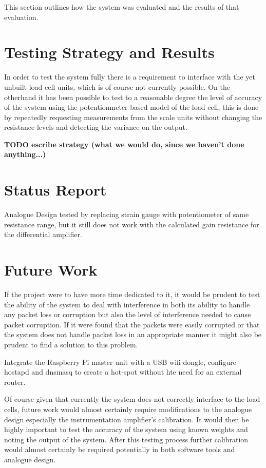 This section outlines how the system was evaluated and the results of that evaluation.

\section{Testing Strategy and Results}

In order to test the system fully there is a requirement to interface with the yet unbuilt load cell units, which is of course not currently possible. On the otherhand it has been possible to test to a reasonable degree the level of accuracy of the system using the potentionmeter based model of the load cell, this is done by repeatedly requesting measurements from the scale units without changing the resistance levels and detecting the variance on the output. 

\textbf{TODO escribe strategy (what we would do, since we haven't done anything...)}

\section{Status Report}

Analogue Design tested by replacing strain gauge with potentiometer of same resistance range, but it still does not work with the calculated gain resistance for the differential amplifier.

\section{Future Work}

If the project were to have more time dedicated to it, it would be prudent to test the ability of the system to deal with interference in both its ability to handle any packet loss or corruption but also the level of interference needed to cause packet corruption. If it were found that the packets were easily corrupted or that the system does not handle packet loss in an appropriate manner it might also be prudent to find a solution to this problem.

Integrate the Raspberry Pi master unit with a USB wifi dongle, configure hostapd and dnsmasq to create a hot-spot without hte need for an external router.

Of course given that currently the system does not correctly interface to the load cells, future work would almost certainly require modifications to the analogue design especially the instrumentation amplifier's calibration. It would then be highly important to test the accuracy of the system using known weights and noting the output of the system. After this testing process further calibration would almost certainly be required potentially in both software tools and analogue design. 


